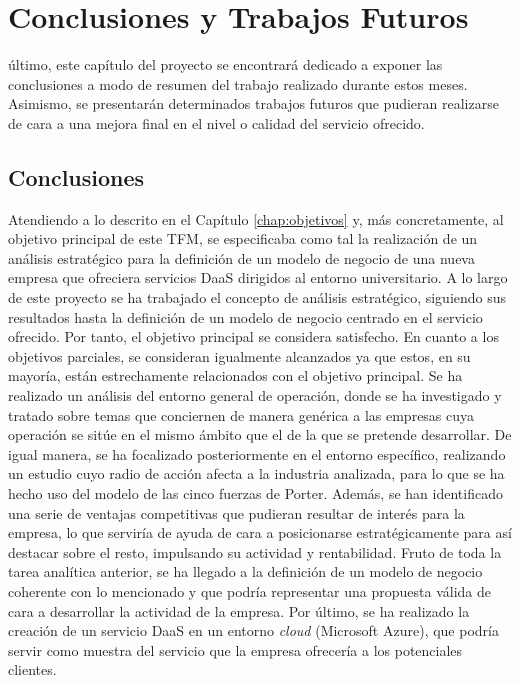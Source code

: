 \chapter{Conclusiones y Trabajos Futuros}
\label{chap:conclusiones}

 último, este capítulo del proyecto se encontrará dedicado a exponer las conclusiones a modo de resumen del trabajo realizado durante estos meses. Asimismo, se presentarán determinados trabajos futuros que pudieran realizarse de cara a una mejora final en el nivel o calidad del servicio ofrecido.

\section{Conclusiones}
Atendiendo a lo descrito en el Capítulo \ref{chap:objetivos} y, más concretamente, al objetivo principal de este \acs{TFM}, se especificaba como tal la realización de un análisis estratégico para la definición de un modelo de negocio de una nueva empresa que ofreciera servicios \acs{DaaS} dirigidos al entorno universitario. A lo largo de este proyecto se ha trabajado el concepto de análisis estratégico, siguiendo sus resultados hasta la definición de un modelo de negocio centrado en el servicio ofrecido. Por tanto, el objetivo principal se considera satisfecho. En cuanto a los objetivos parciales, se consideran igualmente alcanzados ya que estos, en su mayoría, están estrechamente relacionados con el objetivo principal. Se ha realizado un análisis del entorno general de operación, donde se ha investigado y tratado sobre temas que conciernen de manera genérica a las empresas cuya operación se sitúe en el mismo ámbito que el de la que se pretende desarrollar. De igual manera, se ha focalizado posteriormente en el entorno específico, realizando un estudio cuyo radio de acción afecta a la industria analizada, para lo que se ha hecho uso del modelo de las cinco fuerzas de Porter. Además, se han identificado una serie de ventajas competitivas que pudieran resultar de interés para la empresa, lo que serviría de ayuda de cara a posicionarse estratégicamente para así destacar sobre el resto, impulsando su actividad y rentabilidad. Fruto de toda la tarea analítica anterior, se ha llegado a la definición  de un modelo de negocio coherente con lo mencionado y que podría representar una propuesta válida de cara a desarrollar la actividad de la empresa. Por último, se ha realizado la creación de un servicio \acs{DaaS} en un entorno \textit{cloud} (Microsoft Azure), que podría servir como muestra del servicio que la empresa ofrecería a los potenciales clientes.

